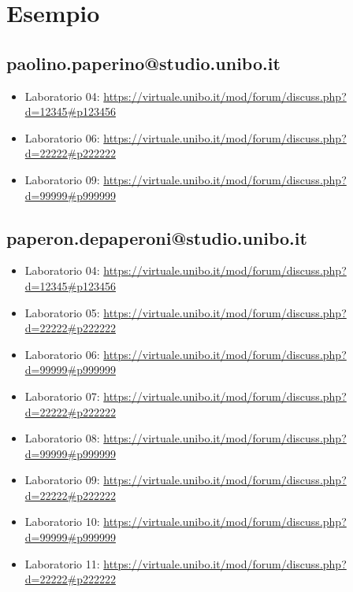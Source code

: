 \documentclass[a4paper,12pt]{report}
\begin{document}
\section*{Esempio}

\subsection{paolino.paperino@studio.unibo.it}

\begin{itemize}
 \item Laboratorio 04: \url{https://virtuale.unibo.it/mod/forum/discuss.php?d=12345#p123456}
 \item Laboratorio 06: \url{https://virtuale.unibo.it/mod/forum/discuss.php?d=22222#p222222}
 \item Laboratorio 09: \url{https://virtuale.unibo.it/mod/forum/discuss.php?d=99999#p999999}
\end{itemize}

\subsection{paperon.depaperoni@studio.unibo.it}

\begin{itemize}
 \item Laboratorio 04: \url{https://virtuale.unibo.it/mod/forum/discuss.php?d=12345#p123456}
 \item Laboratorio 05: \url{https://virtuale.unibo.it/mod/forum/discuss.php?d=22222#p222222}
 \item Laboratorio 06: \url{https://virtuale.unibo.it/mod/forum/discuss.php?d=99999#p999999}
 \item Laboratorio 07: \url{https://virtuale.unibo.it/mod/forum/discuss.php?d=22222#p222222}
 \item Laboratorio 08: \url{https://virtuale.unibo.it/mod/forum/discuss.php?d=99999#p999999}
 \item Laboratorio 09: \url{https://virtuale.unibo.it/mod/forum/discuss.php?d=22222#p222222}
 \item Laboratorio 10: \url{https://virtuale.unibo.it/mod/forum/discuss.php?d=99999#p999999}
 \item Laboratorio 11: \url{https://virtuale.unibo.it/mod/forum/discuss.php?d=22222#p222222}
\end{itemize}




\end{document}
